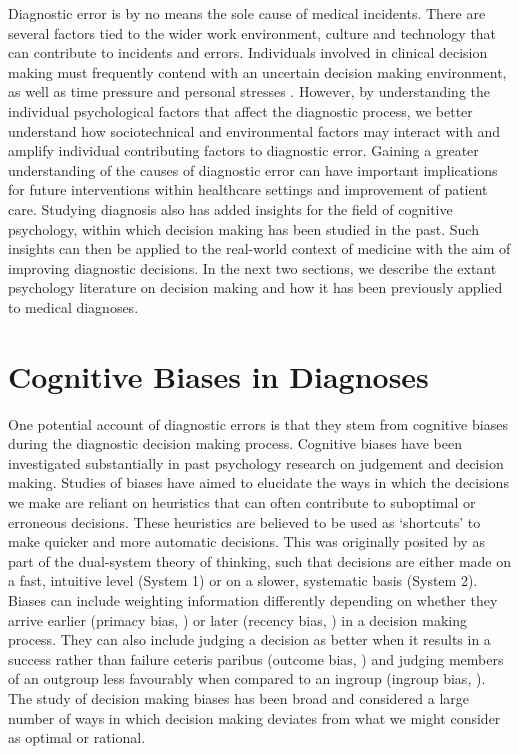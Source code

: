 \documentclass[a4paper, nobind]{templates/ociamthesis}
\begin{document}
\hfill\break
Diagnostic error is by no means the sole cause of medical incidents. There are several factors tied to the wider work environment, culture and technology that can contribute to incidents and errors. Individuals involved in clinical decision making must frequently contend with an uncertain decision making environment, as well as time pressure and personal stresses \autocite{yates_physician_2020}. However, by understanding the individual psychological factors that affect the diagnostic process, we better understand how sociotechnical and environmental factors may interact with and amplify individual contributing factors to diagnostic error. Gaining a greater understanding of the causes of diagnostic error can have important implications for future interventions within healthcare settings and improvement of patient care. Studying diagnosis also has added insights for the field of cognitive psychology, within which decision making has been studied in the past. Such insights can then be applied to the real-world context of medicine with the aim of improving diagnostic decisions. In the next two sections, we describe the extant psychology literature on decision making and how it has been previously applied to medical diagnoses.

\section*{Cognitive Biases in Diagnoses}\label{cognitive-biases-in-diagnoses}

One potential account of diagnostic errors is that they stem from cognitive biases during the diagnostic decision making process. Cognitive biases have been investigated substantially in past psychology research on judgement and decision making. Studies of biases have aimed to elucidate the ways in which the decisions we make are reliant on heuristics that can often contribute to suboptimal or erroneous decisions. These heuristics are believed to be used as `shortcuts' to make quicker and more automatic decisions. This was originally posited by \textcite{kahneman_thinking_2011} as part of the dual-system theory of thinking, such that decisions are either made on a fast, intuitive level (System 1) or on a slower, systematic basis (System 2). Biases can include weighting information differently depending on whether they arrive earlier (primacy bias, \textcite{saetrevik_anchoring_2020}) or later (recency bias, \textcite{chapman_order_1996}) in a decision making process. They can also include judging a decision as better when it results in a success rather than failure ceteris paribus (outcome bias, \autocite{baron_outcome_1988,aiyer_outcomes_2023}) and judging members of an outgroup less favourably when compared to an ingroup (ingroup bias, \autocite{tarrant_social_2012}). The study of decision making biases has been broad and considered a large number of ways in which decision making deviates from what we might consider as optimal or rational.
\end{document}
